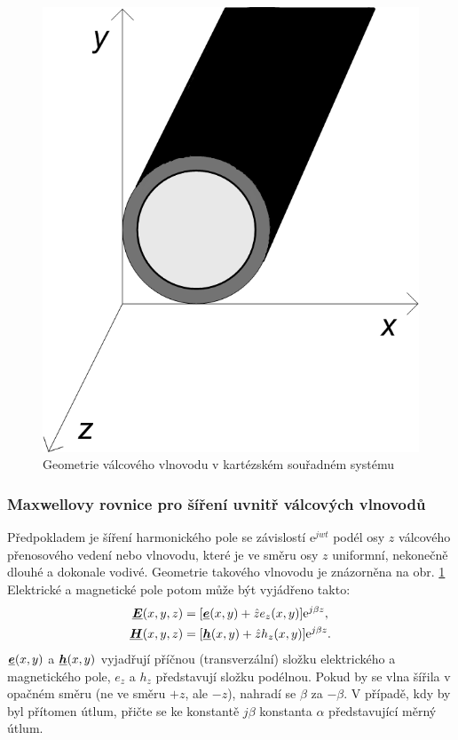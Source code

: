 \documentclass[12pt,a4paper,oneside]{article}
\numberwithin{equation}{section} %
\numberwithin{figure}{section} %
\numberwithin{table}{section} %
\newcommand{\me}{\mathrm{e}} %
\renewcommand{\vec}[1]{\mbox{\boldmath$#1$}} %
\newcommand{\faz}[1]{{\underline{#1}}} %
\begin{document}
\begin{figure} 
\begin{center}
\includegraphics{geometrie.png}
\caption{Geometrie válcového vlnovodu v kartézském souřadném systému}
\label{geometrie}
\end{center}
\end{figure}

\subsubsection{Maxwellovy rovnice pro šíření uvnitř válcových vlnovodů}
Předpokladem je šíření harmonického pole se závislostí $\me ^{jwt}$ podél osy $z$ válcového přenosového vedení nebo vlnovodu, které je ve směru osy $z$ uniformní, nekonečně dlouhé a dokonale vodivé. Geometrie takového vlnovodu je znázorněna na obr. \ref{geometrie} Elektrické a magnetické pole potom může být vyjádřeno takto:
\begin{subequations}
\label{hromadna}
\begin{align}
\faz{\vec{E}}(x, y, z)&=[\faz{\vec{e}}(x, y) + \hat{z}e_z(x, y)] \me ^{j\beta z} ,
\\
\faz{\vec{H}}(x, y, z)&=[\faz{\vec{h}}(x, y) + \hat{z}h_z(x, y)] \me ^{j\beta z} .
\end{align}
\end{subequations}
$\faz{\vec{e}}(x,y)$ a $\faz{\vec{h}}(x,y)$ vyjadřují příčnou (transverzální) složku elektrického a magnetického pole, $e_z$ a $h_z$ představují složku podélnou. Pokud by se vlna šířila v opačném směru (ne ve směru $+z$, ale $-z$), nahradí se $\beta$ za $-\beta$. V případě, kdy by byl přítomen útlum, přičte se ke konstantě $j \beta$ konstanta $\alpha$ představující měrný útlum.
\end{document}

